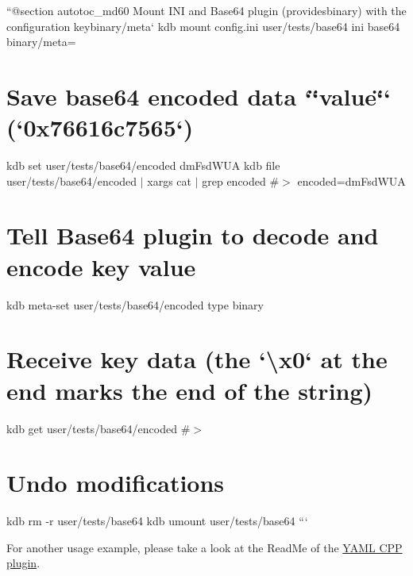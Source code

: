 ``{\ttfamily  @section autotoc\+\_\+md60 Mount I\+NI and Base64 plugin (provides}binary{\ttfamily ) with the configuration key}binary/meta` kdb mount config.\+ini user/tests/base64 ini base64 binary/meta=\hypertarget{autotoc_md52_autotoc_md61}{}\section{Save base64 encoded data `\char`\"{}value\char`\"{}` (`0x76616c7565`)}\label{autotoc_md52_autotoc_md61}
kdb set user/tests/base64/encoded dm\+Fsd\+W\+UA kdb file user/tests/base64/encoded $\vert$ xargs cat $\vert$ grep encoded \#$>$ encoded=dm\+Fsd\+W\+UA\hypertarget{autotoc_md52_autotoc_md62}{}\section{Tell Base64 plugin to decode and encode key value}\label{autotoc_md52_autotoc_md62}
kdb meta-\/set user/tests/base64/encoded type binary\hypertarget{autotoc_md52_autotoc_md63}{}\section{Receive key data (the `\textbackslash{}x0` at the end marks the end of the string)}\label{autotoc_md52_autotoc_md63}
kdb get user/tests/base64/encoded \#$>$ \hypertarget{autotoc_md52_autotoc_md64}{}\section{Undo modifications}\label{autotoc_md52_autotoc_md64}
kdb rm -\/r user/tests/base64 kdb umount user/tests/base64 ```

For another usage example, please take a look at the Read\+Me of the \hyperlink{autotoc_md865_src_plugins_yamlcpp_README_md}{Y\+A\+ML C\+PP plugin}. 